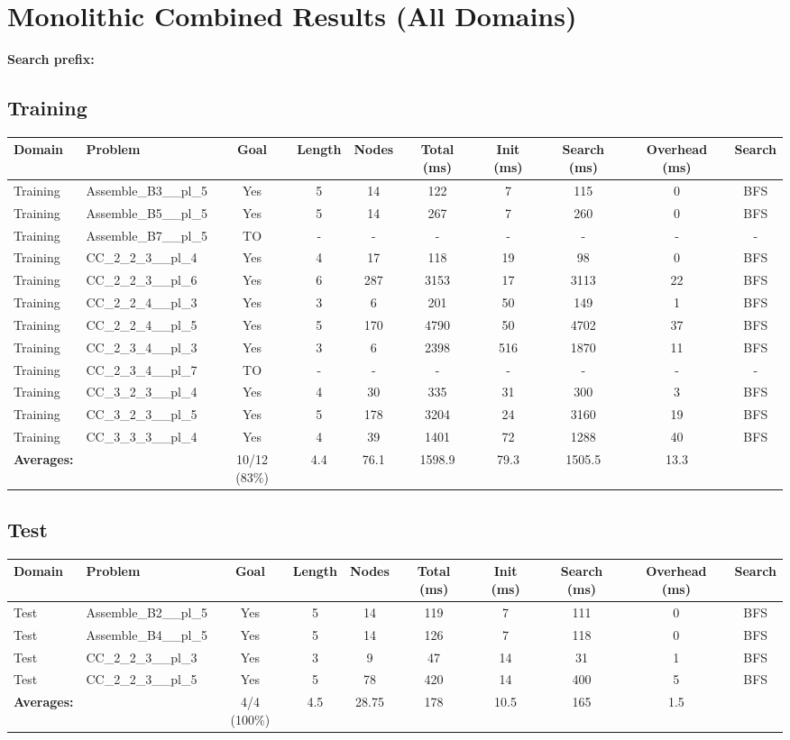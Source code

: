 \documentclass{article}
\begin{document}
\section*{Monolithic Combined Results (All Domains)}
\textbf{Search prefix:} 
\\[0.5cm]
\subsection*{Training}
\begin{tabular}{llcccccccc}
\toprule
Domain & Problem & Goal & Length & Nodes & Total (ms) & Init (ms) & Search (ms) & Overhead (ms) & Search \\
\midrule
Training & Assemble\_B3\_\_pl\_5 & Yes & 5 & 14 & 122 & 7 & 115 & 0 & BFS \\
Training & Assemble\_B5\_\_pl\_5 & Yes & 5 & 14 & 267 & 7 & 260 & 0 & BFS \\
Training & Assemble\_B7\_\_pl\_5 & TO & - & - & - & - & - & - & - \\
Training & CC\_2\_2\_3\_\_pl\_4 & Yes & 4 & 17 & 118 & 19 & 98 & 0 & BFS \\
Training & CC\_2\_2\_3\_\_pl\_6 & Yes & 6 & 287 & 3153 & 17 & 3113 & 22 & BFS \\
Training & CC\_2\_2\_4\_\_pl\_3 & Yes & 3 & 6 & 201 & 50 & 149 & 1 & BFS \\
Training & CC\_2\_2\_4\_\_pl\_5 & Yes & 5 & 170 & 4790 & 50 & 4702 & 37 & BFS \\
Training & CC\_2\_3\_4\_\_pl\_3 & Yes & 3 & 6 & 2398 & 516 & 1870 & 11 & BFS \\
Training & CC\_2\_3\_4\_\_pl\_7 & TO & - & - & - & - & - & - & - \\
Training & CC\_3\_2\_3\_\_pl\_4 & Yes & 4 & 30 & 335 & 31 & 300 & 3 & BFS \\
Training & CC\_3\_2\_3\_\_pl\_5 & Yes & 5 & 178 & 3204 & 24 & 3160 & 19 & BFS \\
Training & CC\_3\_3\_3\_\_pl\_4 & Yes & 4 & 39 & 1401 & 72 & 1288 & 40 & BFS \\
\textbf{Averages:} & & 10/12 (83\%) & 4.4 & 76.1 & 1598.9 & 79.3 & 1505.5 & 13.3 & \\
\bottomrule
\end{tabular}
\newpage
\subsection*{Test}
\begin{tabular}{llcccccccc}
\toprule
Domain & Problem & Goal & Length & Nodes & Total (ms) & Init (ms) & Search (ms) & Overhead (ms) & Search \\
\midrule
Test & Assemble\_B2\_\_pl\_5 & Yes & 5 & 14 & 119 & 7 & 111 & 0 & BFS \\
Test & Assemble\_B4\_\_pl\_5 & Yes & 5 & 14 & 126 & 7 & 118 & 0 & BFS \\
Test & CC\_2\_2\_3\_\_pl\_3 & Yes & 3 & 9 & 47 & 14 & 31 & 1 & BFS \\
Test & CC\_2\_2\_3\_\_pl\_5 & Yes & 5 & 78 & 420 & 14 & 400 & 5 & BFS \\
\textbf{Averages:} & & 4/4 (100\%) & 4.5 & 28.75 & 178 & 10.5 & 165 & 1.5 & \\
\bottomrule
\end{tabular}
\newpage
\end{document}
